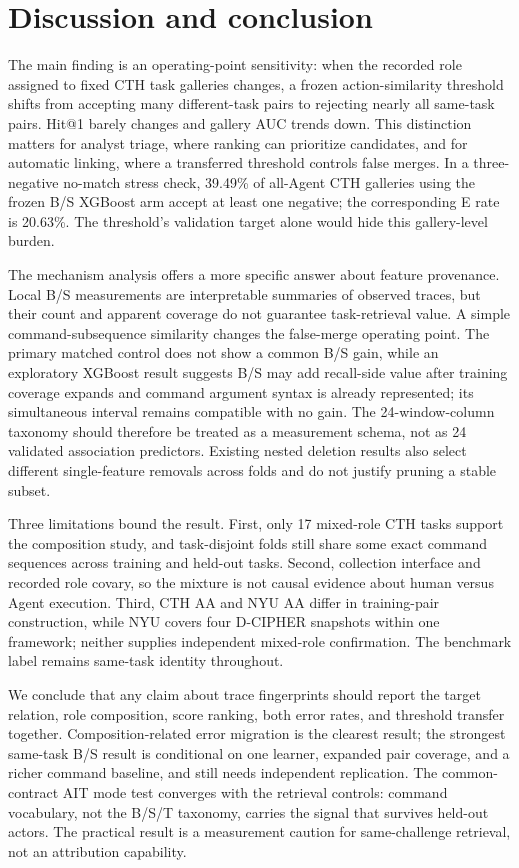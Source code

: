 \documentclass[10pt]{article}
\begin{document}
\section{Discussion and conclusion}
The main finding is an operating-point sensitivity: when the recorded role assigned to fixed CTH task galleries changes, a frozen action-similarity threshold shifts from accepting many different-task pairs to rejecting nearly all same-task pairs. Hit@1 barely changes and gallery AUC trends down. This distinction matters for analyst triage, where ranking can prioritize candidates, and for automatic linking, where a transferred threshold controls false merges. In a three-negative no-match stress check, 39.49\% of all-Agent CTH galleries using the frozen B/S XGBoost arm accept at least one negative; the corresponding E rate is 20.63\%. The threshold's validation target alone would hide this gallery-level burden.

The mechanism analysis offers a more specific answer about feature provenance. Local B/S measurements are interpretable summaries of observed traces, but their count and apparent coverage do not guarantee task-retrieval value. A simple command-subsequence similarity changes the false-merge operating point. The primary matched control does not show a common B/S gain, while an exploratory XGBoost result suggests B/S may add recall-side value after training coverage expands and command argument syntax is already represented; its simultaneous interval remains compatible with no gain. The 24-window-column taxonomy should therefore be treated as a measurement schema, not as 24 validated association predictors. Existing nested deletion results also select different single-feature removals across folds and do not justify pruning a stable subset.

Three limitations bound the result. First, only 17 mixed-role CTH tasks support the composition study, and task-disjoint folds still share some exact command sequences across training and held-out tasks. Second, collection interface and recorded role covary, so the mixture is not causal evidence about human versus Agent execution. Third, CTH AA and NYU AA differ in training-pair construction, while NYU covers four D-CIPHER snapshots within one framework; neither supplies independent mixed-role confirmation. The benchmark label remains same-task identity throughout.

We conclude that any claim about trace fingerprints should report the target relation, role composition, score ranking, both error rates, and threshold transfer together. Composition-related error migration is the clearest result; the strongest same-task B/S result is conditional on one learner, expanded pair coverage, and a richer command baseline, and still needs independent replication. The common-contract AIT mode test converges with the retrieval controls: command vocabulary, not the B/S/T taxonomy, carries the signal that survives held-out actors. The practical result is a measurement caution for same-challenge retrieval, not an attribution capability.
\end{document}
